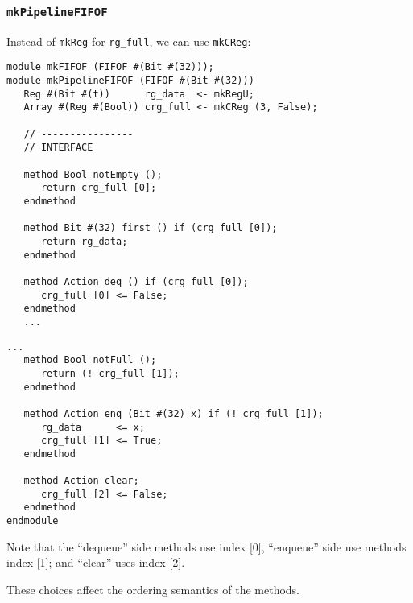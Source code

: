 \begin{frame}[fragile]
\frametitle{{\tt mkPipelineFIFOF}}

\label{mkPipelineFIFOF}

\footnotesize

Instead of {\tt mkReg} for {\tt rg\_full}, we can use {\tt mkCReg}:

\begin{center}
\begin{minipage}[t]{0.485\textwidth}\scriptsize
\begin{Verbatim}[frame=single]
module mkFIFOF (FIFOF #(Bit #(32)));
module mkPipelineFIFOF (FIFOF #(Bit #(32)))
   Reg #(Bit #(t))      rg_data  <- mkRegU;
   Array #(Reg #(Bool)) crg_full <- mkCReg (3, False);

   // ----------------
   // INTERFACE

   method Bool notEmpty ();
      return crg_full [0];
   endmethod

   method Bit #(32) first () if (crg_full [0]);
      return rg_data;
   endmethod

   method Action deq () if (crg_full [0]);
      crg_full [0] <= False;
   endmethod
   ...
\end{Verbatim}
\end{minipage}
\begin{minipage}[t]{0.485\textwidth}\scriptsize
\begin{Verbatim}[frame=single]
   ...
   method Bool notFull ();
      return (! crg_full [1]);
   endmethod

   method Action enq (Bit #(32) x) if (! crg_full [1]);
      rg_data      <= x;
      crg_full [1] <= True;
   endmethod

   method Action clear;
      crg_full [2] <= False;
   endmethod
endmodule
\end{Verbatim}

\vspace{1ex}

Note that the ``dequeue'' side methods use index [0], ``enqueue'' side
use methods index [1]; and ``clear'' uses index [2].

\vspace{1ex}

These choices affect the ordering semantics of the methods.

\end{minipage}
\end{center}

\end{frame}

